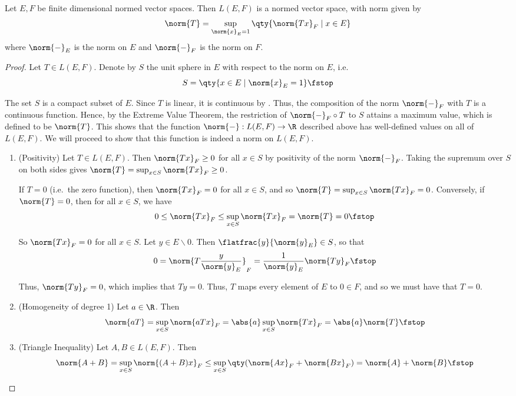  \begin{theorem}
   Let \( E,F \) be finite dimensional normed vector spaces. Then \( L(E,F) \) is a normed vector space, with norm given by
   \[ \norm{T}=\sup_{\norm{x}_E=1}\qty{\norm{Tx}_F\mid x\in E} \]
   where \( \norm{-}_E \) is the norm on \( E \) and \( \norm{-}_F\) is the norm on \( F \).
 \end{theorem}
 \begin{proof}
   Let \( T\in L(E,F) \). Denote by \( S \) the unit sphere in \( E \) with respect to the norm on \( E \), i.e.\
   \[ S=\qty{x\in E\mid \norm{x}_E=1}\fstop \]

   The set \( S \) is a compact subset of \( E \). Since \( T \) is linear, it is continuous by . Thus, the composition of the norm \( \norm{-}_F \) with \( T \) is a continuous function. Hence, by the Extreme Value Theorem, the restriction of \( \norm{-}_F\circ T \) to \( S \) attains a maximum value, which is defined to be \( \norm{T} \). This shows that the function \( \norm{-}:L(E,F)\to\R \) described above has well-defined values on all of \( L(E,F) \). We will proceed to show that this function is indeed a norm on \( L(E,F) \).
   \begin{enumerate}[label=(\roman*)]
   \item (Positivity) Let \( T\in L(E,F) \). Then \( \norm{Tx}_F\geq 0 \) for all \( x\in S \) by positivity of the norm \( \norm{-}_F \). Taking the supremum over \( S \) on both sides gives \( \norm{T}=\sup_{x\in S}\norm{Tx}_F\geq 0 \).

     \vspace{3mm}

     If \( T=0 \) (i.e.\ the zero function), then \( \norm{Tx}_F=0 \) for all \( x\in S \), and so \( \norm{T}=\sup_{x\in S}\norm{Tx}_F=0 \). Conversely, if \( \norm{T}=0 \), then for all \( x\in S \), we have
     \[ 0\leq\norm{Tx}_F\leq\sup_{x\in S}\norm{Tx}_F=\norm{T}=0\fstop \]

     So \( \norm{Tx}_F=0 \) for all \( x\in S \). Let \( y\in E\backslash\qty{0} \). Then \( \flatfrac{y}{\norm{y}_E}\in S \), so that
     \[ 0=\norm{T\frac{y}{\norm{y}_E}}_F=\frac{1}{\norm{y}_E}\norm{Ty}_F\fstop \]

     Thus, \( \norm{Ty}_F=0 \), which implies that \( Ty=0 \). Thus, \( T \) maps every element of \( E \) to \( 0\in F \), and so we must have that \( T=0 \).
   \item (Homogeneity of degree 1) Let \( a\in\R \). Then
     \[ \norm{aT}=\sup_{x\in S}\norm{aTx}_F=\abs{a}\sup_{x\in S}\norm{Tx}_F=\abs{a}\norm{T}\fstop \]
   \item (Triangle Inequality) Let \( A,B\in L(E,F) \). Then
     \[ \norm{A+B}=\sup_{x\in S}\norm{(A+B)x}_F\leq\sup_{x\in S}\qty(\norm{Ax}_F+\norm{Bx}_F)=\norm{A}+\norm{B}\fstop \]
   \end{enumerate}
 \end{proof}

